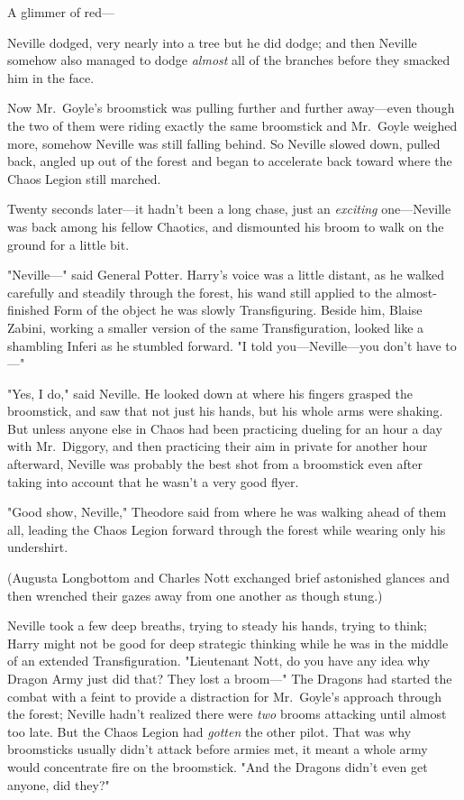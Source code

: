 A glimmer of red---

Neville dodged, very nearly into a tree but he did dodge; and then Neville 
somehow also managed to dodge \emph{almost} all of the branches before they 
smacked him in the face.

Now Mr.~Goyle's broomstick was pulling further and further away---even though 
the two of them were riding exactly the same broomstick and Mr.~Goyle weighed 
more, somehow Neville was still falling behind. So Neville slowed down, pulled 
back, angled up out of the forest and began to accelerate back toward where the 
Chaos Legion still marched.

Twenty seconds later---it hadn't been a long chase, just an \emph{exciting} 
one---Neville was back among his fellow Chaotics, and dismounted his broom to 
walk on the ground for a little bit.

"Neville---" said General Potter. Harry's voice was a little distant, as he 
walked carefully and steadily through the forest, his wand still applied to the 
almost-finished Form of the object he was slowly Transfiguring. Beside him, 
Blaise Zabini, working a smaller version of the same Transfiguration, looked 
like a shambling Inferi as he stumbled forward. "I told you---Neville---you 
don't have to---"

"Yes, I do," said Neville. He looked down at where his fingers grasped the 
broomstick, and saw that not just his hands, but his whole arms were shaking. 
But unless anyone else in Chaos had been practicing dueling for an hour a day 
with Mr.~Diggory, and then practicing their aim in private for another hour 
afterward, Neville was probably the best shot from a broomstick even after 
taking into account that he wasn't a very good flyer.

"Good show, Neville," Theodore said from where he was walking ahead of them 
all, leading the Chaos Legion forward through the forest while wearing only his 
undershirt.

(Augusta Longbottom and Charles Nott exchanged brief astonished glances and 
then wrenched their gazes away from one another as though stung.)

Neville took a few deep breaths, trying to steady his hands, trying to think; 
Harry might not be good for deep strategic thinking while he was in the middle 
of an extended Transfiguration. "Lieutenant Nott, do you have any idea why 
Dragon Army just did that? They lost a broom---" The Dragons had started the 
combat with a feint to provide a distraction for Mr.~Goyle's approach through 
the forest; Neville hadn't realized there were \emph{two} brooms attacking 
until almost too late. But the Chaos Legion had \emph{gotten} the other pilot. 
That was why broomsticks usually didn't attack before armies met, it meant a 
whole army would concentrate fire on the broomstick. "And the Dragons didn't 
even get anyone, did they?"

